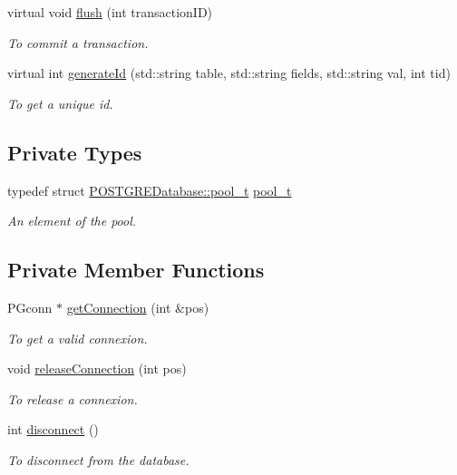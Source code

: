 \begin{DoxyCompactItemize}
virtual void \hyperlink{classPOSTGREDatabase_a558be82c58bcd1dd1b019bf9bfb88ded}{flush} (int transactionID)
\begin{DoxyCompactList}\small\item\em To commit a transaction. \item\end{DoxyCompactList}\item 
virtual int \hyperlink{classPOSTGREDatabase_abf052a5ce6b62c3be2c96ec8a4a13887}{generateId} (std::string table, std::string fields, std::string val, int tid)
\begin{DoxyCompactList}\small\item\em To get a unique id. \item\end{DoxyCompactList}\end{DoxyCompactItemize}
\subsection*{Private Types}
\begin{DoxyCompactItemize}
\item 
\hypertarget{classPOSTGREDatabase_a48a0b798834146488a3626ea8af3acdb}{
typedef struct \hyperlink{structPOSTGREDatabase_1_1pool__t}{POSTGREDatabase::pool\_\-t} \hyperlink{classPOSTGREDatabase_a48a0b798834146488a3626ea8af3acdb}{pool\_\-t}}
\label{classPOSTGREDatabase_a48a0b798834146488a3626ea8af3acdb}

\begin{DoxyCompactList}\small\item\em An element of the pool. \item\end{DoxyCompactList}\end{DoxyCompactItemize}
\subsection*{Private Member Functions}
\begin{DoxyCompactItemize}
\item 
PGconn $\ast$ \hyperlink{classPOSTGREDatabase_a8a09eb602c9a20af9663b2e7c048682d}{getConnection} (int \&pos)
\begin{DoxyCompactList}\small\item\em To get a valid connexion. \item\end{DoxyCompactList}\item 
void \hyperlink{classPOSTGREDatabase_a2d7fcd4fe54836067a1fa31a829a3410}{releaseConnection} (int pos)
\begin{DoxyCompactList}\small\item\em To release a connexion. \item\end{DoxyCompactList}\item 
int \hyperlink{classPOSTGREDatabase_af026bcf159590b97226d829bddb8e00a}{disconnect} ()
\begin{DoxyCompactList}\small\item\em To disconnect from the database. \item\end{DoxyCompactList}\end{DoxyCompactItemize}
